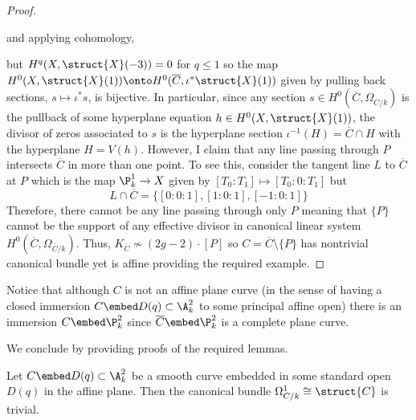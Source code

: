 \begin{proof}
\begin{center}
\end{center}
and applying cohomology,
\begin{center}
\end{center}
but $H^q(X, \struct{X}(-3)) = 0$ for $q \le 1$ so the map $H^0(X, \struct{X}(1)) \onto H^0(\overline{C}, \iota^* \struct{X}(1))$ given by pulling back sections, $s \mapsto \iota^* s$, is bijective. In particular, since any section $s \in H^0(\overline{C}, \Omega_{\overline{C}/k})$ is the pullback of some hyperplane equation $h \in H^0(X, \struct{X}(1))$, the divisor of zeros associated to $s$ is the hyperplane section $\iota^{-1}(H) = \overline{C} \cap H$ with the hyperplane $H = V(h)$. However, I claim that any line passing through $P$ intersects $\overline{C}$ in more than one point. To see this, consider the tangent line $L$ to $\overline{C}$ at $P$ which is the map $\P^1_k \to X$ given by $[T_0 : T_1] \mapsto [T_0 : 0 : T_1]$ but
\[ L \cap \overline{C} = \{[0 : 0 : 1], [1 : 0 : 1], [-1 : 0 : 1] \} \]
Therefore, there cannot be any line passing through only $P$ meaning that $\{ P \}$ cannot be the support of any effective divisor in canonical linear system $H^0(\overline{C}, \Omega_{\overline{C}/k})$. Thus, $K_{\overline{C}} \not\sim (2g - 2) \cdot [P]$ so $C = \overline{C} \setminus \{ P \}$ has nontrivial canonical bundle yet is affine providing the required example.
\end{proof}

\begin{rmk}
Notice that although $C$ is not an affine plane curve (in the sense of having a closed immersion $C \embed D(q) \subset \A^2_k$ to some principal affine open) there is an immersion $C \embed \P^2_k$ since $\overline{C} \embed \P^2_k$ is a complete plane curve.
\end{rmk}
\noindent
We conclude by providing proofs of the required lemmas.

\begin{lemma} \label{plane_curve_trivial_canonical}
Let $C \embed D(q) \subset \A^2_k$ be a smooth curve embedded in some standard open $D(q)$ in the affine plane. Then the canonical bundle $\Omega^1_{C/k} \cong \struct{C}$ is trivial.
\end{lemma}

